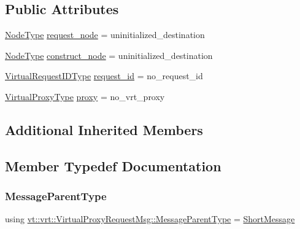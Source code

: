 \subsection*{Public Attributes}
\begin{DoxyCompactItemize}
\item 
\hyperlink{namespacevt_a866da9d0efc19c0a1ce79e9e492f47e2}{Node\+Type} \hyperlink{structvt_1_1vrt_1_1_virtual_proxy_request_msg_a17ef52708baa6ba8c47e5a8b7e3a0eb9}{request\+\_\+node} = uninitialized\+\_\+destination
\item 
\hyperlink{namespacevt_a866da9d0efc19c0a1ce79e9e492f47e2}{Node\+Type} \hyperlink{structvt_1_1vrt_1_1_virtual_proxy_request_msg_ae57a7fa0849abff9b9c94206fa458de5}{construct\+\_\+node} = uninitialized\+\_\+destination
\item 
\hyperlink{namespacevt_1_1vrt_ac7ef8820ebfc383fa16f09bf46eaa2b8}{Virtual\+Request\+I\+D\+Type} \hyperlink{structvt_1_1vrt_1_1_virtual_proxy_request_msg_a1cbd1a90c8e622e455d2d9dffd7631cf}{request\+\_\+id} = no\+\_\+request\+\_\+id
\item 
\hyperlink{namespacevt_a1b417dd5d684f045bb58a0ede70045ac}{Virtual\+Proxy\+Type} \hyperlink{structvt_1_1vrt_1_1_virtual_proxy_request_msg_ae7e2b6629045422a7a1fee6dc6b84d1f}{proxy} = no\+\_\+vrt\+\_\+proxy
\end{DoxyCompactItemize}
\subsection*{Additional Inherited Members}


\subsection{Member Typedef Documentation}
\mbox{\label{structvt_1_1vrt_1_1_virtual_proxy_request_msg_a3d01fee6b94b001f36785e32c218b836}} 
\subsubsection{\texorpdfstring{Message\+Parent\+Type}{MessageParentType}}
{\footnotesize\ttfamily using \hyperlink{structvt_1_1vrt_1_1_virtual_proxy_request_msg_a3d01fee6b94b001f36785e32c218b836}{vt\+::vrt\+::\+Virtual\+Proxy\+Request\+Msg\+::\+Message\+Parent\+Type} =  \hyperlink{namespacevt_a1125ac1da6c0bbf141e0ea0739d7602d}{Short\+Message}}



